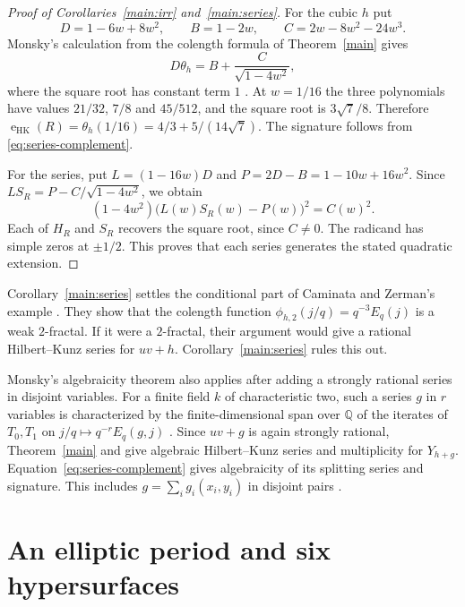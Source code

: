 \documentclass[11pt,a4paper,reqno]{amsart}
\numberwithin{equation}{section}
\theoremstyle{plain}
\newcommand{\eHK}{\operatorname{e}_{\mathrm{HK}}}
\begin{document}
\begin{proof}[Proof of Corollaries~\ref{main:irr} and~\ref{main:series}]
For the cubic $h$ put
\[
 D=1-6w+8w^2,\qquad B=1-2w,\qquad C=2w-8w^2-24w^3 .
\]
Monsky's calculation from the colength formula of Theorem~\ref{main} gives
\begin{equation}\label{eq:theta}
 D\theta_h=B+\frac{C}{\sqrt{1-4w^2}},
\end{equation}
where the square root has constant term $1$ \cite[Lemma~2.1]{Mtrans}. At $w=1/16$ the three polynomials have values $21/32$, $7/8$ and $45/512$, and the square root is $3\sqrt7/8$. Therefore $\eHK(R)=\theta_h(1/16)=4/3+5/(14\sqrt7)$. The signature follows from \eqref{eq:series-complement}.

For the series, put $L=(1-16w)D$ and $P=2D-B=1-10w+16w^2$. Since $LS_R=P-C/\sqrt{1-4w^2}$, we obtain
\begin{equation}\label{eq:splitting-polynomial}
 (1-4w^2)\bigl(L(w)S_R(w)-P(w)\bigr)^2=C(w)^2 .
\end{equation}
Each of $H_R$ and $S_R$ recovers the square root, since $C\ne0$. The radicand has simple zeros at $\pm1/2$. This proves that each series generates the stated quadratic extension.
\end{proof}

Corollary~\ref{main:series} settles the conditional part of Caminata and Zerman's example \cite[Example~4.6]{CZ}. They show that the colength function $\phi_{h,2}(j/q)=q^{-3}E_q(j)$ is a weak $2$-fractal. If it were a $2$-fractal, their argument would give a rational Hilbert--Kunz series for $uv+h$. Corollary~\ref{main:series} rules this out.

Monsky's algebraicity theorem also applies after adding a strongly rational series in disjoint variables. For a finite field $k$ of characteristic two, such a series $g$ in $r$ variables is characterized by the finite-dimensional span over $\mathbb Q$ of the iterates of $T_0,T_1$ on $j/q\mapsto q^{-r}E_q(g,j)$ \cite{MT,M09}. Since $uv+g$ is again strongly rational, Theorem~\ref{main} and \cite[Theorem~3.4]{M09} give algebraic Hilbert--Kunz series and multiplicity for $Y_{h+g}$. Equation~\eqref{eq:series-complement} gives algebraicity of its splitting series and signature. This includes $g=\sum_i g_i(x_i,y_i)$ in disjoint pairs \cite[Theorem~3.3]{M09}.

\section{An elliptic period and six hypersurfaces}\label{sec:period}
\end{document}
